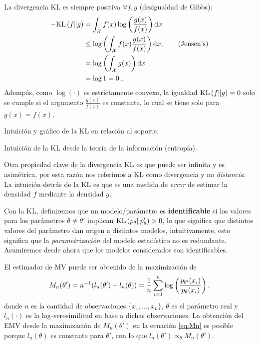 \begin{remark} La divergencia KL es siempre positiva $\forall f,g$ (desigualdad de Gibbs):
\begin{align*}
 	-\text{KL}\left(f\middle\|g\right)  &= \int_{\mathcal X} f(x)\log\left(\frac{g(x)}{f(x)}\right){\text{d}x}\\
 				&\leq \log\left(\int_{\mathcal X} f(x)\frac{g(x)}{f(x)}\right){\text{d}x}, \quad\quad \text{(Jensen's)}\\
 				&= \log\left(\int_{\mathcal X} g(x)\right){\text{d}x}\\
 				&=\log 1=0.,	
 \end{align*} 
Adempás, como $\log(\cdot)$ es estrictamente convexo, la igualdad $\text{KL}\left(f\middle\|g\right)=0$ solo se cumple si el argumento $\frac{g(x)}{f(x)}$ es constante, lo cual se tiene solo para ${g(x)} = {f(x)}$.
\end{remark}

\begin{remark} Intuición y gráfico de la KL en relación al soporte.
\end{remark}

\begin{remark} Intuición de la KL desde la teoría de la información (entropía).
\end{remark}



Otra propiedad clave de la divergencia KL es que puede ser infinita y es asimétrica, por esta razón nos referimos a KL como divergencia y no \emph{distancia}. La intuición detrás de la KL es que es una medida de \textit{error} de estimar la densidad $f$ mediante la densidad $g$. 

 Con la KL, definiremos que un modelo/parámetro es \textbf{identificable} si los valores para los parámetros $\theta\neq\theta'$ implican $\text{KL}\left(p_\theta\middle\|p_\theta'\right)>0$, lo que significa que distintos valores del parámetro dan origen a distintos modelos, intuitivamente, esto significa que la \emph{parametrización} del modelo estadístico no es redundante. Asumiremos desde ahora que los modelos considerados son identificables.

El estimador de MV puede ser obtenido de la maximización de
\begin{equation}
\label{eq:Mn}
 	M_n (\theta') = n^{-1} (l_n(\theta') - l_n(\theta))  = \frac{1}{n} \sum_{i=1}^n \log\left(\frac{p_{\theta'}(x_i)}{p_{\theta}(x_i)}\right),
 \end{equation} 
 donde $n$ es la cantidad de observaciones $\{x_1,\ldots,x_n\}$, $\theta$ es el parámetro real y $l_n(\cdot)$ es la log-verosimilitud en base a dichas observaciones. La obtención del EMV desde la maximización de $M_n (\theta')$ en la ecuación \eqref{eq:Mn} es posible porque $l_n(\theta)$ es constante para $\theta'$, con lo que $l_n(\theta')\propto_{\theta}M_n (\theta')$. 
 
